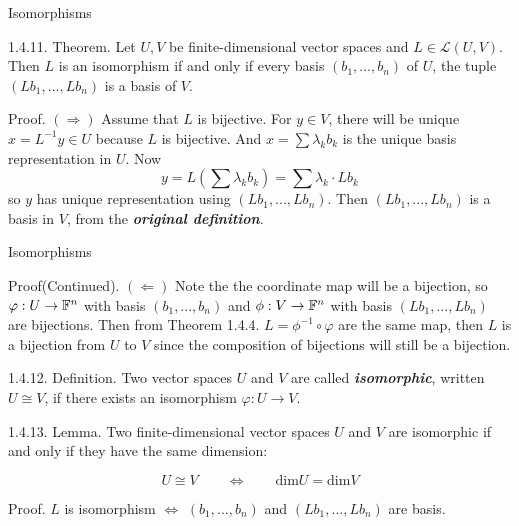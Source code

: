 \documentclass[hyperref={pdfpagelabels=true}]{beamer}
\newcommand{\highlightr}[1]{\textcolor[rgb]{1,0.3,0.2}{\emph{\textbf{#1}}}}
\newcommand{\highlightg}[1]{\textcolor[rgb]{0.1,0.5,0.3}{\emph{\textbf{#1}}}}
\newcommand{\structb}[1]{\textcolor[rgb]{0.2,0.2,0.7}{#1}}
\newcommand{\<}{\langle}
\renewcommand{\>}{\rangle}
\begin{document}
\begin{frame}{Isomorphisms}
    \begin{block}{1.4.11. Theorem.}
        Let $U,V$ be finite-dimensional vector spaces and $L \in \mathcal{L}(U,V)$. Then $L$ is an isomorphism if and only if every basis $(b_{1},...,b_{n})$ of $U$, the tuple $(Lb_{1},...,Lb_{n})$ is a basis of $V$.
    \end{block}
    \begin{block}{Proof.}
        \structb{$(\Rightarrow)$} Assume that $L$ is bijective. For $y \in V$, there will be unique $x = L^{-1}y \in U$ because $L$ is bijective. And $x = \sum \lambda_{k}b_{k}$ is the unique basis representation in $U$. Now
        \[y = L(\sum \lambda_{k}b_{k}) = \sum \lambda_{k} \cdot Lb_{k}\]
        so $y$ has unique representation using $(Lb_{1},...,Lb_{n})$. Then $(Lb_{1},...,Lb_{n})$ is a basis in $V$, from the \highlightr{original definition}.\\
    \end{block}
\end{frame}
\begin{frame}{Isomorphisms}
    \begin{block}{Proof(Continued).}
        \structb{$(\Leftarrow)$} Note the the coordinate map will be a bijection, so 
        $\varphi:U \rightarrow \mathbb{F}^{n}$ with basis $(b_{1},...,b_{n})$ and $\phi:V \rightarrow \mathbb{F}^{n}$ with basis $(Lb_{1},...,Lb_{n})$ are bijections. Then from Theorem 1.4.4. $L = \phi^{-1} \circ \varphi$ are the same map, then $L$ is a bijection from $U$ to $V$ since the composition of bijections will still be a bijection.
    \end{block}
    \begin{block}{1.4.12. Definition.} Two vector spaces $U$ and $V$ are called \highlightg{isomorphic}, written $U \cong V$, if there exists an isomorphism $\varphi:U \rightarrow V$.
    \end{block}
    \begin{block}{1.4.13. Lemma.} Two finite-dimensional vector spaces $U$ and $V$ are isomorphic if and only if they have the same dimension:
    \begin{spacing}{0.5}
        \[U \cong V \qquad \Leftrightarrow \qquad \text{dim}U = \text{dim}V\]
    \end{spacing}
    \end{block}
    \begin{block}{Proof.}
        $L$ is isomorphism
        $\Leftrightarrow$ $(b_{1},...,b_{n})$ and $(Lb_{1},...,Lb_{n})$ are basis.
    \end{block}
\end{frame}
\end{document}
